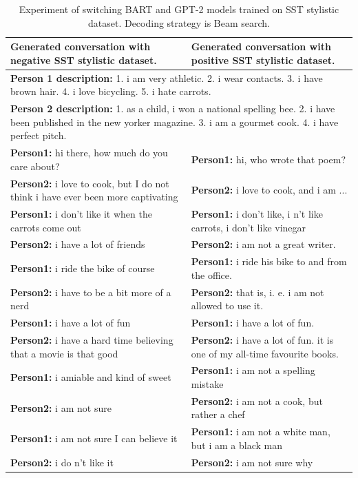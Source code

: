 \begin{table}[H]
\centering
 \begin{tabular}{|p{7cm}|p{7cm}|} 
 \hline
 \textbf{Generated conversation with negative SST stylistic dataset.} & \textbf{Generated conversation with positive SST stylistic dataset.}\\
 \hline
 \multicolumn{2}{|p{14cm}|}{\textbf{Person 1 description:} 1. i am very athletic. 2. i wear contacts. 3. i have brown hair. 4. i love bicycling. 5. i hate carrots.} \\
 \hline
 \multicolumn{2}{|p{14cm}|}{\textbf{Person 2 description:} 1. as a child, i won a national spelling bee. 2. i have been published in the new yorker magazine. 3. i am a gourmet cook. 4. i have perfect pitch.} \\
 \hline
 \textbf{Person1:} hi there, how much do you care about? & \textbf{Person1:} hi, who wrote that poem? \\
 \textbf{Person2:} i love to cook, but I do not think i have ever been more captivating &  \textbf{Person2:} i love to cook, and i am ... \\ 
 \textbf{Person1:} i don't like it when the carrots come out & \textbf{Person1:} i don't like, i n't like carrots, i don't like vinegar \\
 \textbf{Person2:} i have a lot of friends & \textbf{Person2:} i am not a great writer. \\
 \textbf{Person1:} i ride the bike of course & \textbf{Person1:} i ride his bike to and from the office. \\
 \textbf{Person2:} i have to be a bit more of a nerd & \textbf{Person2:} that is, i. e. i am not allowed to use it.  \\
 \textbf{Person1:} i have a lot of fun & \textbf{Person1:} i have a lot of fun. \\
 \textbf{Person2:} i have a hard time believing that a movie is that good & \textbf{Person2:} i have a lot of fun. it is one of my all-time favourite books. \\
 \textbf{Person1:} i amiable and kind of sweet & \textbf{Person1:} i am not a spelling mistake \\
 \textbf{Person2:} i am not sure & \textbf{Person2:} i am not a cook, but rather a chef \\
 \textbf{Person1:} i am not sure I can believe it & \textbf{Person1:} i am not a white man, but i am a black man \\
 \textbf{Person2:} i do n't like it & \textbf{Person2:} i am not sure why \\
 \hline
 \end{tabular}
 \caption{Experiment of switching BART and GPT-2 models trained on SST stylistic dataset. Decoding strategy is Beam search.}
\label{tab:sst_switch}
\end{table}

